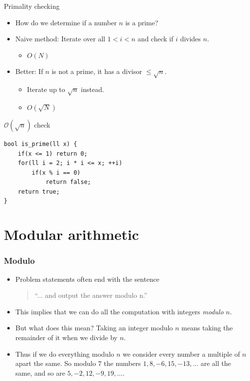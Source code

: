 \documentclass{beamer}
\begin{document}
\begin{frame}[plain]{Primality checking}
  \vspace{20pt}
  \begin{itemize}
    \item How do we determine if a number $n$ is a prime?
    \item {\color{dark green}Naive method:} Iterate over all $1 < i < n$ and check if
      $i$ divides $n$.
      \begin{itemize}
        \item  $O(N)$
      \end{itemize}
    \item {\color{dark green}Better:} If $n$ is not a prime, it has a divisor $\leq \sqrt{n}$.
      \begin{itemize}
        \item Iterate up to $\sqrt{n}$ instead.
        \item $O(\sqrt{N})$
      \end{itemize}
  \end{itemize}
\end{frame}

\begin{frame}{$\mathcal{O}(\sqrt{n})$ check}
\begin{verbatim}
bool is_prime(ll x) {
    if(x <= 1) return 0;
    for(ll i = 2; i * i <= x; ++i)
        if(x % i == 0)
            return false;
    return true;
}
\end{verbatim}
\end{frame}

\section*{Modular arithmetic}

\begin{frame}
  \frametitle{Modulo}
  \vspace{30pt}
  \begin{itemize}
    \item Problem statements often end with the sentence \\
      \vspace{10pt}
      \begin{quote}
``... and output the answer modulo n.''
      \end{quote}
      \vspace{10pt}
    \item This implies that we can do all the computation with integers \emph{modulo }$n$.
    \item But what does this mean? Taking an integer modulo $n$ means taking the remainder of it when we divide by $n$.
    \item Thus if we do everything modulo $n$ we consider every number a multiple of $n$ apart the same. So modulo $7$ the numbers $1, 8, -6, 15, -13, \dots$ are all the same, and so are $5, -2, 12, -9, 19, \dots$.
  \end{itemize}
\end{frame}
\end{document}
